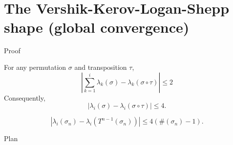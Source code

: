 \documentclass[english]{beamer}
\begin{document}
\section{The Vershik-Kerov-Logan-Shepp shape (global convergence)}
\begin{frame}{Proof}
\begin{lemma} \label{lemma2}
For any permutation $\sigma$ and transposition  $\tau$,\begin{equation*} \label{sum}
\left|\sum_{k=1}^i \lambda_k(\sigma)-{\lambda}_k\left(\sigma\circ\tau\right)\right| \leq 2
\end{equation*}
Consequently, 
\begin{equation*} \label{sep}
\left|\lambda_i(\sigma)-\lambda_i\left(\sigma\circ\tau\right)\right| \leq 4.
\end{equation*}
\end{lemma}
\begin{corollary}
\begin{equation} \label{sep2}
\left|\lambda_i(\sigma_n)-\lambda_i\left(T^{n-1}(\sigma_n)\right)\right| \leq 4(\#(\sigma_n)-1).
\end{equation}
\end{corollary}
\end{frame}
\begin{frame}{Plan}
\tableofcontents[currentsection,currentsubsection,
    hideothersubsections, 
    sectionstyle=show/shaded,
]
\end{frame}
\end{document}
